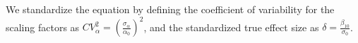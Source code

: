 We standardize the equation by defining the coefficient of variability for the scaling factors as $CV_{\alpha}^2 = ({\frac{\sigma_{\alpha}}{\alpha_0}})^2$, and the standardized true effect size as $\delta = \frac{\beta_{10}}{\sigma_0}$.